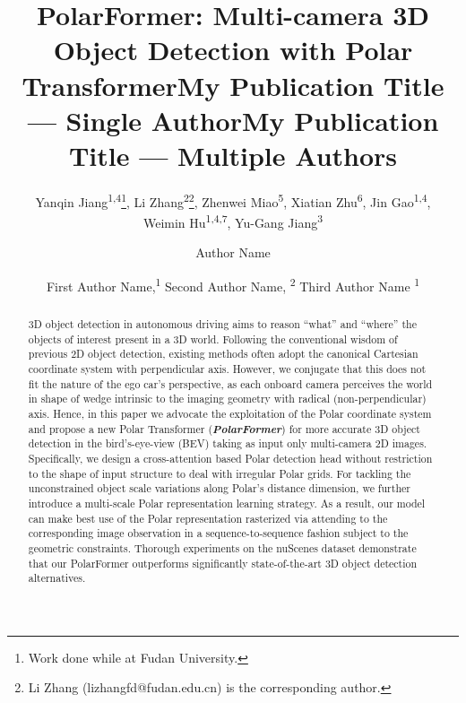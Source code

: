 \documentclass[letterpaper]{article} \usepackage{aaai23}  \usepackage{times}  \usepackage{helvet}  \usepackage{courier}  \usepackage[hyphens]{url}  \usepackage{graphicx} \urlstyle{rm} \def\UrlFont{\rm}  \usepackage{natbib}  \usepackage{caption} \frenchspacing  \setlength{\pdfpagewidth}{8.5in} \setlength{\pdfpageheight}{11in} \usepackage{algorithm}
\title{PolarFormer: Multi-camera 3D Object Detection with
Polar Transformer}
\author{
Yanqin Jiang\textsuperscript{\rm 1,4}\thanks {Work done while at Fudan University.},
    Li Zhang\textsuperscript{\rm 2}\thanks{Li Zhang (lizhangfd@fudan.edu.cn) is the corresponding author.
},
    Zhenwei Miao\textsuperscript{\rm 5},
    Xiatian Zhu\textsuperscript{\rm 6},
    Jin Gao\textsuperscript{\rm 1,4},\\
    Weimin Hu\textsuperscript{\rm 1,4,7},
    Yu-Gang Jiang\textsuperscript{\rm 3}
}
\title{My Publication Title --- Single Author}
\author {
    Author Name
}
\title{My Publication Title --- Multiple Authors}
\author {
First Author Name,\textsuperscript{\rm 1}
    Second Author Name, \textsuperscript{\rm 2}
    Third Author Name \textsuperscript{\rm 1}
}
\begin{document}
\maketitle



\begin{abstract}
3D object detection in autonomous driving aims to reason ``what'' and ``where'' the objects of interest present
in a 3D world.
Following the conventional wisdom of previous 2D object detection,
existing methods often adopt the canonical Cartesian coordinate system with perpendicular axis.
However, we conjugate that this does not fit the nature of the ego car's perspective, as each onboard camera perceives
the world in shape of wedge intrinsic to the imaging geometry with radical (non-perpendicular) axis.
Hence, in this paper we advocate the exploitation of the Polar coordinate system and propose a new Polar Transformer ({\bf\em PolarFormer})
for more accurate 3D object detection in the bird's-eye-view (BEV)
taking as input only multi-camera 2D images.
Specifically, we design a cross-attention based Polar detection head without
restriction to the shape of input structure to deal with irregular Polar grids.
For tackling the unconstrained object scale variations along Polar's distance dimension, we further introduce a multi-scale Polar representation learning strategy.
As a result, our model can make best use of the Polar representation rasterized via attending to the corresponding image observation
in a sequence-to-sequence fashion subject to the geometric constraints.
Thorough experiments on the nuScenes dataset  demonstrate that our PolarFormer outperforms significantly state-of-the-art 3D object detection alternatives.
\end{abstract}
\end{document}
